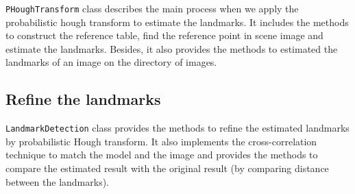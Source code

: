 \texttt{PHoughTransform} class describes the main process when we apply the probabilistic hough transform to estimate the landmarks. It includes the methods to construct the reference table, find the reference point in scene image and estimate the landmarks. Besides, it also provides the methods to estimated the landmarks of an image on the directory of images.
\subsection{Refine the landmarks}
\texttt{LandmarkDetection} class provides the methods to refine the estimated landmarks by probabilistic Hough transform. It also implements the cross-correlation technique to match the model and the image and provides the methods to compare the estimated result with the original result (by comparing distance between the landmarks).